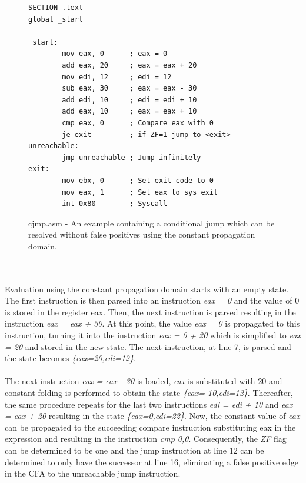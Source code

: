 \documentclass{kththesis}
\renewcommand{\it}[1]{\textit{#1}}
\begin{document}
\begin{figure}[!ht]
    \centering
\begin{tcolorbox}
\begin{verbatim}
SECTION .text
global _start

_start:
        mov eax, 0      ; eax = 0
        add eax, 20     ; eax = eax + 20
        mov edi, 12     ; edi = 12
        sub eax, 30     ; eax = eax - 30
        add edi, 10     ; edi = edi + 10
        add eax, 10     ; eax = eax + 10
        cmp eax, 0      ; Compare eax with 0
        je exit         ; if ZF=1 jump to <exit>
unreachable:            
        jmp unreachable ; Jump infinitely
exit:
        mov ebx, 0      ; Set exit code to 0
        mov eax, 1      ; Set eax to sys_exit
        int 0x80        ; Syscall
\end{verbatim}
\end{tcolorbox}
\caption{cjmp.asm - An example containing a conditional jump which can be resolved without false positives using the constant propagation domain.}
    \label{fig:cjmp.asm}
\end{figure}
\noindent
\\ \\
Evaluation using the constant propagation domain starts with an empty state. The first instruction is then parsed into an instruction \it{eax = 0} and the value of 0 is stored in the register eax. Then, the next instruction is parsed resulting in the instruction \it{eax = eax + 30}. At this point, the value \it{eax = 0} is propagated to this instruction, turning it into the instruction \it{eax = 0 + 20} which is simplified to \it{eax = 20} and stored in the new state. The next instruction, at line 7, is parsed and the state becomes \it{\{eax=20,edi=12\}}.
\\ \\
The next instruction \it{eax = eax - 30} is loaded, \it{eax} is substituted with 20 and constant folding is performed to obtain the state \it{\{eax=-10,edi=12\}}. Thereafter, the same procedure repeats for the last two instructions \it{edi = edi + 10} and \it{eax = eax + 20} resulting in the state \it{\{eax=0,edi=22\}}. Now, the constant value of \it{eax} can be propagated to the succeeding compare instruction substituting eax in the expression and resulting in the instruction \it{cmp 0,0}. Consequently, the \it{ZF} flag can be determined to be one and the jump instruction at line 12 can be determined to only have the successor at line 16, eliminating a false positive edge in the CFA to the unreachable jump instruction. 
\end{document}
